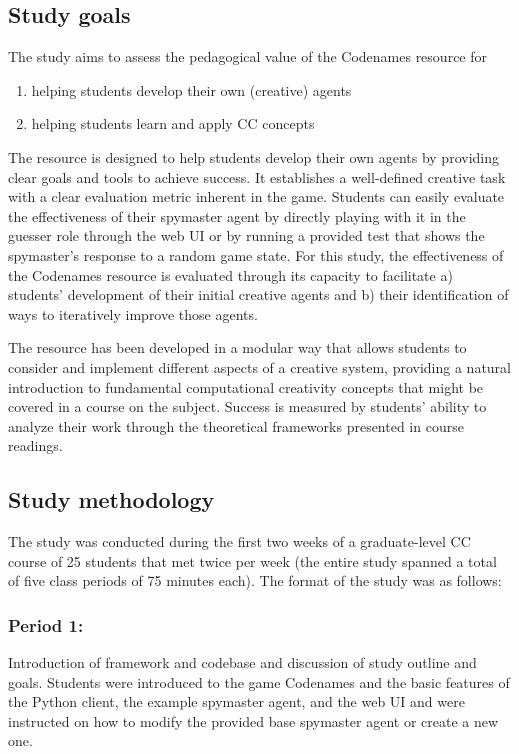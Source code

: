 \documentclass[phd,electronic,oneside,twosidetoc,letterpaper,chaptercenter,parttop,lof]{byumsphd}
\begin{document}
\subsection{Study goals}

The study aims to assess the pedagogical value of the Codenames resource for

\begin{enumerate}
\item helping students develop their own (creative) agents
\item helping students learn and apply CC concepts
\end{enumerate}

The resource is designed to help students develop their own agents by providing clear goals and tools to achieve success.  It establishes a well-defined creative task with a clear evaluation metric inherent in the game. Students can easily evaluate the effectiveness of their spymaster agent by directly playing with it in the guesser role through the web UI or by running a provided test that shows the spymaster's response to a random game state. For this study, the effectiveness of the Codenames resource is evaluated through its capacity to facilitate a) students' development of their initial creative agents and b) their identification of ways to iteratively improve those agents.

The resource has been developed in a modular way that allows students to consider and implement different aspects of a creative system, providing a natural introduction to fundamental computational creativity concepts that might be covered in a course on the subject. Success is measured by students' ability to analyze their work through the theoretical frameworks presented in course readings. 

\subsection{Study methodology}

The study was conducted during the first two weeks of a graduate-level CC course of 25 students that met twice per week (the entire study spanned a total of five class periods of 75 minutes each).  The format of the study was as follows:

\subsubsection{Period 1:} Introduction of framework and codebase and discussion of study outline and goals.  Students were introduced to the game Codenames and the basic features of the Python client, the example spymaster agent, and the web UI and were instructed on how to modify the provided base spymaster agent or create a new one.
\end{document}
